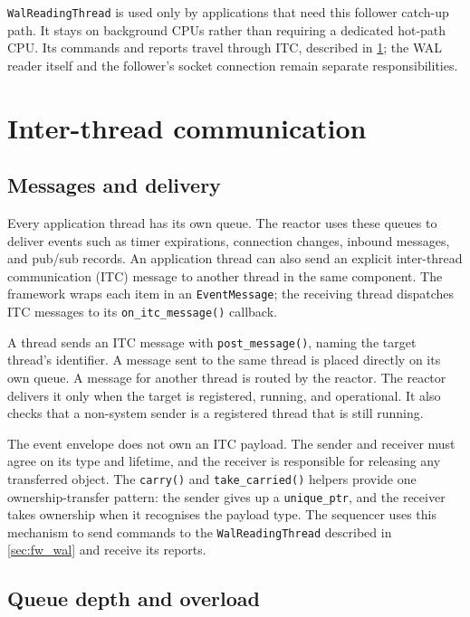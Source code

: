 \texttt{WalReadingThread} is used only by applications that need this
follower catch-up path. It stays on background CPUs rather than requiring a
dedicated hot-path CPU. Its commands and reports travel through ITC, described
in \cref{sec:fw_itc}; the WAL reader itself and the follower's socket
connection remain separate responsibilities.

\section{Inter-thread communication}
\label{sec:fw_itc}

\subsection{Messages and delivery}

Every application thread has its own queue. The reactor uses these queues to
deliver events such as timer expirations, connection changes, inbound messages,
and pub/sub records. An application thread can also send an explicit
inter-thread communication (ITC) message to another thread in the same
component. The framework wraps each item in an \texttt{EventMessage}; the
receiving thread dispatches ITC messages to its \texttt{on\_itc\_message()}
callback.

A thread sends an ITC message with \texttt{post\_message()}, naming the target
thread's identifier. A message sent to the same thread is placed directly on
its own queue. A message for another thread is routed by the reactor. The
reactor delivers it only when the target is registered, running, and
operational. It also checks that a non-system sender is a registered thread
that is still running.

The event envelope does not own an ITC payload. The sender and receiver must
agree on its type and lifetime, and the receiver is responsible for releasing
any transferred object. The \texttt{carry()} and \texttt{take\_carried()}
helpers provide one ownership-transfer pattern: the sender gives up a
\texttt{unique\_ptr}, and the receiver takes ownership when it recognises the
payload type. The sequencer uses this mechanism to send commands to the
\texttt{WalReadingThread} described in \cref{sec:fw_wal} and receive its
reports.

\subsection{Queue depth and overload}

